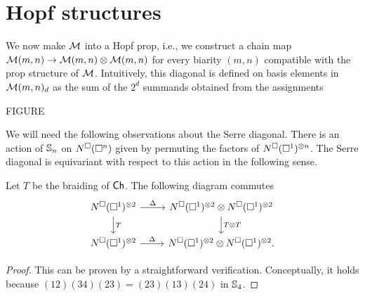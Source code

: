 
\section{Hopf structures}

We now make $\M$ into a Hopf prop, i.e., we construct a chain map $\M(m,n) \to \M(m,n) \otimes \M(m,n)$ for every biarity $(m,n)$ compatible with the prop structure of $\M$.
Intuitively, this diagonal is defined on basis elements in $\M(m,n)_d$ as the sum of the $2^d$ summands obtained from the assignments 

FIGURE

We will need the following observations about the Serre diagonal.
There is an action of $\S_n$ on $\cchains(\square^n)$ given by permuting the factors of $\cchains(\square^1)^{\otimes n}$.
The Serre diagonal is equivariant with respect to this action in the following sense.

\begin{lemma} \label{l:serre diagonal invariant}
	Let $T$ be the braiding of $\Ch$.
	The following diagram commutes
	\begin{equation*}
	\begin{tikzcd}
	\cchains(\square^1)^{\otimes 2} \arrow[r, "\Delta"] \arrow[d, "T"] &
	\cchains(\square^1)^{\otimes 2} \otimes \cchains(\square^1)^{\otimes 2} \arrow[d, "T \otimes T"] \\
	\cchains(\square^1)^{\otimes 2} \arrow[r, "\Delta"] &
	\cchains(\square^1)^{\otimes 2} \otimes \cchains(\square^1)^{\otimes 2}.
	\end{tikzcd}
	\end{equation*}
\end{lemma}

\begin{proof}
	This can be proven by a straightforward verification. Conceptually, it holds because $(12)(34)(23) = (23)(13)(24)$ in $\S_4$.
\end{proof}

